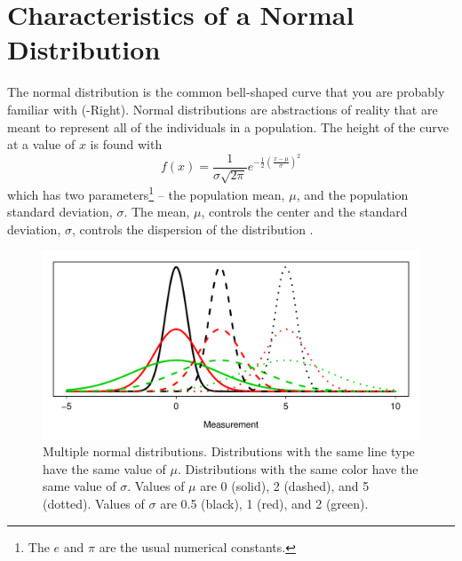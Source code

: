 \documentclass[10pt,openany]{book}\usepackage[]{graphicx}\usepackage[]{color}
\newenvironment{knitrout}{}{} %
\begin{document}
\section{Characteristics of a Normal Distribution}
The normal distribution is the common bell-shaped curve that you are probably familiar with (-Right).  Normal distributions are abstractions of reality that are meant to represent all of the individuals in a population.  The height of the curve at a value of $x$ is found with
\begin{equation}
  \label{eqn:NormDistfx}
    f(x) = \frac{1}{\sigma\sqrt{2\pi}}e^{-\frac{1}{2}\left(\frac{x-\mu}{\sigma}\right)^{2}}
\end{equation}
which has two parameters\footnote{The $e$ and $\pi$ are the usual numerical constants.} -- the population mean, $\mu$, and the population standard deviation, $\sigma$.  The mean, $\mu$, controls the center and the standard deviation, $\sigma$, controls the dispersion of the distribution .

\begin{knitrout}
\color{fgcolor}\begin{figure}[hbtp]

{\centering \includegraphics[width=.8\linewidth]{Figs/NormMultDists-1} 

}

\caption[Multiple normal distributions]{Multiple normal distributions.  Distributions with the same line type have the same value of $\mu$.  Distributions with the same color have the same value of $\sigma$.  Values of $\mu$ are 0 (solid), 2 (dashed), and 5 (dotted).  Values of $\sigma$ are 0.5 (black), 1 (red), and 2 (green).}\label{fig:NormMultDists}
\end{figure}


\end{knitrout}
\end{document}
